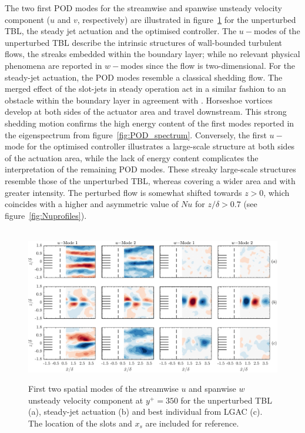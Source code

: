 The two first POD modes for the streamwise and spanwise unsteady velocity component ($u$ and $v$, respectively) are illustrated in figure~\ref{fig:POD} for the unperturbed TBL, the steady jet actuation and the optimised controller. The $u-$modes of the unperturbed TBL describe the intrinsic structures of wall-bounded turbulent flows, the streaks embedded within the boundary layer; while no relevant physical phenomena are reported in $w-$modes since the flow is two-dimensional. For the steady-jet actuation, the POD modes resemble a classical shedding flow. The merged effect of the slot-jets in steady operation act in a similar fashion to an obstacle within the boundary layer in agreement with \citet{Compton1992vorticesJICF}. Horseshoe vortices develop at both sides of the actuator area and travel downstream. This strong shedding motion confirms the high energy content of the first modes reported in the eigenspectrum from figure~\ref{fig:POD_spectrum}. Conversely, the first $u-$mode for the optimised controller illustrates a large-scale structure at both sides of the actuation area, while the lack of energy content complicates the interpretation of the remaining POD modes. These streaky large-scale structures resemble those of the unperturbed TBL, whereas covering a wider area and with greater intensity.
The perturbed flow is somewhat shifted towards $z>0$, which coincides with a higher and asymmetric value of $Nu$ for $z/\delta > 0.7$ (see figure~\ref{fig:Nuprofiles}). 

\begin{figure}[t] %
    \centering\
    \includegraphics[width=0.99\linewidth]{figures/F13.pdf}
    \caption{First two spatial modes of the streamwise $u$ and spanwise $w$ unsteady velocity component at $y^+ = 350$ for the unperturbed TBL (a), steady-jet actuation (b) and best individual from LGAC (c). The location of the slots  and $x_{s}$  are included for reference.}
    \label{fig:POD}
\end{figure}

